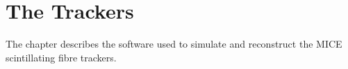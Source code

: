 \chapter{The Trackers}
\label{chapter:tracker}

The chapter describes the software used to simulate and reconstruct the MICE scintillating fibre trackers.


% 
% 
% 
% 
% 
% 
% 